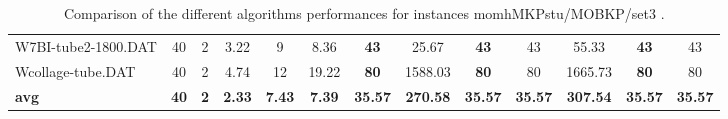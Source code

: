 \begin{table}[h]
{\begin{tabular}{lcccccccccccc}
W7BI-tube2-1800.DAT & 40 & 2 &  \textcolor{blue2}{3.22} & 9 & 8.36 &  \textbf{43} & 25.67 &  \textbf{43} & 43 & 55.33 &  \textbf{43} & 43 \\
Wcollage-tube.DAT & 40 & 2 &  \textcolor{blue2}{4.74} & 12 & 19.22 &  \textbf{80} & 1588.03 &  \textbf{80} & 80 & 1665.73 &  \textbf{80} & 80 \\
\cline{1-13} \textbf{avg} & \textbf{40} & \textbf{2} & \textbf{2.33} & \textbf{7.43} & \textbf{7.39} & \textbf{35.57} & \textbf{270.58} & \textbf{35.57} & \textbf{35.57} & \textbf{307.54} & \textbf{35.57} & \textbf{35.57} \\ \cline{1-13}
\bottomrule
\end{tabular}
}%
\caption{Comparison of the different algorithms performances for instances momhMKPstu/MOBKP/set3 .}
\label{tab:table_compare_momhMKPstu/MOBKP/set3 }
\end{table}

